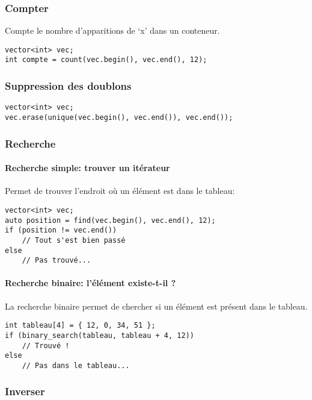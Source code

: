 \documentclass[10pt,a4paper,french]{article}
\begin{document}
\subsubsection{Compter}

Compte le nombre d'apparitions de `x' dans un conteneur.

\begin{verbatim}
vector<int> vec;
int compte = count(vec.begin(), vec.end(), 12);
\end{verbatim}

\subsubsection{Suppression des doublons}

\begin{verbatim}
vector<int> vec;
vec.erase(unique(vec.begin(), vec.end()), vec.end());
\end{verbatim}

\subsubsection{Recherche}

\paragraph{Recherche simple: trouver un itérateur}

Permet de trouver l'endroit où un élément est dans le tableau:

\begin{verbatim}
vector<int> vec;
auto position = find(vec.begin(), vec.end(), 12);
if (position != vec.end())
    // Tout s'est bien passé
else
    // Pas trouvé...
\end{verbatim}

\paragraph{Recherche binaire: l'élément existe-t-il ?}

La recherche binaire permet de chercher si un élément est présent dans le tableau.

\begin{verbatim}
int tableau[4] = { 12, 0, 34, 51 };
if (binary_search(tableau, tableau + 4, 12))
    // Trouvé !
else
    // Pas dans le tableau...
\end{verbatim}

\subsubsection{Inverser}
\end{document}
